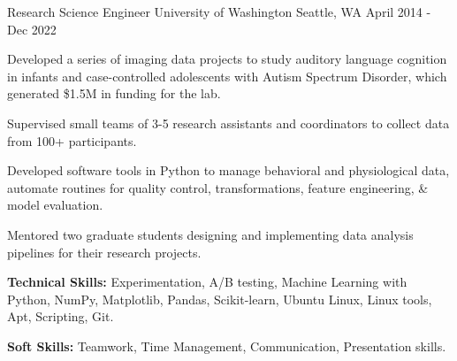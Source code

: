 \begin{cventries}
  \cventry
  {Research Science Engineer} %
  {University of Washington} %
  {Seattle, WA} %
  {April 2014 - Dec 2022} %
  {
    \begin{cvitems} %
      \item {Developed a series of imaging data projects to study auditory language cognition in infants and case-controlled adolescents with Autism Spectrum Disorder, which generated \$1.5M in funding for the lab.}
      \item {Supervised small teams of 3-5 research assistants and coordinators to collect data from 100+ participants.} %
      \item {Developed software tools in Python to manage behavioral and physiological data, automate routines for quality control, transformations, feature engineering, \& model evaluation.}
      \item {Mentored two graduate students designing and implementing data analysis pipelines for their research projects.}
      \item {\textbf{Technical Skills:} Experimentation, A/B testing, Machine Learning with Python, NumPy, Matplotlib, Pandas, Scikit-learn, Ubuntu Linux, Linux tools, Apt, Scripting, Git.}
      \item {\textbf{Soft Skills:} Teamwork, Time Management, Communication, Presentation skills.}
    \end{cvitems}
  }

\end{cventries}
